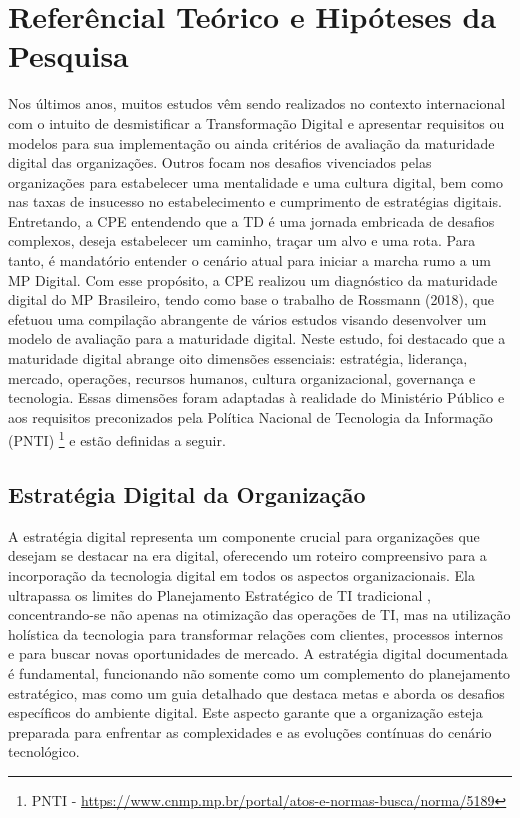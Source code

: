 \section{Referêncial Teórico e Hipóteses da Pesquisa}
Nos últimos anos, muitos estudos vêm sendo realizados no contexto internacional com o intuito de desmistificar a Transformação Digital e apresentar requisitos ou modelos para sua implementação ou ainda critérios de avaliação da maturidade digital das organizações. Outros focam nos desafios vivenciados pelas organizações para estabelecer uma mentalidade e uma cultura digital, bem como nas taxas de insucesso no estabelecimento e cumprimento de estratégias digitais. Entretando, a CPE entendendo que a TD é uma jornada embricada de desafios complexos, deseja estabelecer um caminho, traçar um alvo e uma rota. Para tanto, é mandatório entender o cenário atual para iniciar a marcha rumo a um MP Digital. Com esse propósito, a CPE realizou um diagnóstico da maturidade digital do MP Brasileiro, tendo como base o trabalho de Rossmann (2018), que efetuou uma compilação abrangente de vários estudos visando desenvolver um modelo de avaliação para a maturidade digital. Neste estudo, foi destacado que a maturidade digital abrange oito dimensões essenciais: estratégia, liderança, mercado, operações, recursos humanos, cultura organizacional, governança e tecnologia. Essas dimensões foram adaptadas à realidade do Ministério Público e aos requisitos preconizados pela Política Nacional de Tecnologia da Informação (PNTI) \footnote{PNTI - \url{https://www.cnmp.mp.br/portal/atos-e-normas-busca/norma/5189}} e estão definidas a seguir.

\subsection{Estratégia Digital da Organização }

A estratégia digital representa um componente crucial para organizações que desejam se destacar na era digital, oferecendo um roteiro compreensivo para a incorporação da tecnologia digital em todos os aspectos organizacionais. Ela ultrapassa os limites do Planejamento Estratégico de TI tradicional \cite{dolganova2019company}, concentrando-se não apenas na otimização das operações de TI, mas na utilização holística da tecnologia para transformar relações com clientes, processos internos e para buscar novas oportunidades de mercado. A estratégia digital documentada é fundamental, funcionando não somente como um complemento do planejamento estratégico, mas como um guia detalhado que destaca metas e aborda os desafios específicos do ambiente digital. Este aspecto garante que a organização esteja preparada para enfrentar as complexidades e as evoluções contínuas do cenário tecnológico.

